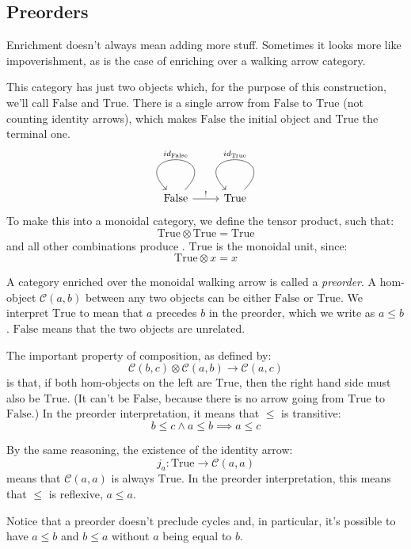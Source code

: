 \documentclass[DaoFP]{subfiles}
\begin{document}
\subsection{Preorders}

Enrichment doesn't always mean adding more stuff. Sometimes it looks more like impoverishment, as is the case of enriching over a walking arrow category. 

This category has just two objects which, for the purpose of this construction, we'll call $\text{False}$ and $\text{True}$. There is a single arrow from $\text{False}$ to $\text{True}$ (not counting identity arrows), which makes $\text{False}$ the initial object and $\text{True}$ the terminal one. 
\[
 \begin{tikzcd}
 \text{False}
 \arrow[r, "!"]
 \arrow[loop, "id_{\text{False}}"']
 & \text{True}
 \arrow[loop, "id_{\text{True}}"']
 \end{tikzcd}
\]
To make this into a monoidal category, we define the tensor product, such that:
\[ \text{True} \otimes \text{True} = \text{True} \]
and all other combinations produce .
$\text{True}$ is the monoidal unit, since:
\[ \text{True} \otimes x = x \]

A category enriched over the monoidal walking arrow is called a \emph{preorder}. A hom-object $\mathcal C (a, b)$ between any two objects can be either $\text{False}$ or $\text{True}$. We interpret $\text{True}$ to mean that $a$ precedes $b$ in the preorder, which we write as $a \le b$. $\text{False}$ means that the two objects are unrelated. 

The important property of composition, as defined by:
\[ \mathcal C (b, c) \otimes \mathcal C (a, b) \to \mathcal C (a, c) \]
is that, if both hom-objects on the left are $\text{True}$, then the right hand side must also be $\text{True}$. (It can't be $\text{False}$, because there is no arrow going from $\text{True}$ to $\text{False}$.) In the preorder interpretation, it means that $\le$ is transitive:
\[ b \le c \land a \le b \implies a \le c \]

By the same reasoning, the existence of the identity arrow:
\[ j_a \colon \text{True} \to \mathcal C(a, a) \]
means that $\mathcal C(a, a)$ is always $\text{True}$. In the preorder interpretation, this means that $\le$ is reflexive, $a \le a$.

Notice that a preorder doesn't preclude cycles and, in particular, it's possible to have $a \le b$ and $b \le a$ without $a$ being equal to $b$. 
\end{document}
